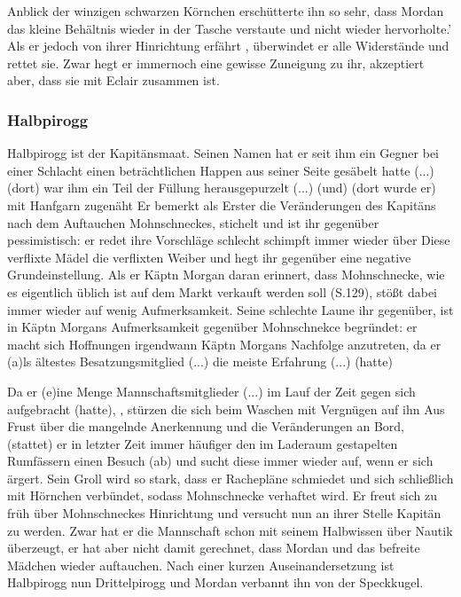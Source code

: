 Anblick der winzigen schwarzen Körnchen erschütterte ihn so sehr, dass Mordan das kleine Behältnis wieder in der Tasche verstaute und nicht wieder hervorholte.'\cite[S.531]{pir} Als er jedoch von ihrer Hinrichtung erfährt , überwindet er alle Widerstände und rettet sie. \cite[S.620]{pir} Zwar hegt er immernoch eine gewisse Zuneigung zu ihr, akzeptiert aber, dass sie mit Eclair zusammen ist. \cite[S.632f]{pir}

\subsubsection{Halbpirogg}
Halbpirogg ist der Kapitänsmaat. Seinen Namen hat er seit ihm ein Gegner bei einer Schlacht 
einen beträchtlichen Happen aus seiner Seite gesäbelt hatte (...)(dort) 
war ihm ein Teil der Füllung herausgepurzelt (...) 
(und) (dort wurde er) mit Hanfgarn zugenäht\cite[S. 33]{pir}
Er bemerkt als Erster die Veränderungen des Kapitäns nach 
dem Auftauchen Mohnschneckes, stichelt und ist ihr gegenüber pessimistisch:
er redet ihre Vorschläge schlecht \cite[S. 266]{pir} schimpft immer wieder über Diese verflixte Mädel\cite[S. 145]{pir}
die verflixten Weiber \cite[302]{pir}und 
hegt ihr gegenüber eine negative Grundeinstellung. \cite[S. 297]{pir}
Als er Käptn Morgan daran erinnert, dass Mohnschnecke, wie es eigentlich üblich ist \cite[S.50]{pir} 
auf dem Markt verkauft werden soll (S.129), stößt dabei immer wieder auf wenig Aufmerksamkeit. \cite[S. 145]{pir}
Seine schlechte Laune ihr gegenüber, ist in Käptn Morgans Aufmerksamkeit gegenüber Mohnschnekce begründet: er macht
sich Hoffnungen irgendwann Käptn Morgans Nachfolge anzutreten, 
da er (a)ls ältestes Besatzungsmitglied (...) die meiste Erfahrung (...) (hatte)\cite[S.371]{pir}
 
Da er (e)ine Menge Mannschaftsmitglieder  (...) im Lauf der Zeit gegen sich aufgebracht (hatte), \cite[S.151]{pir}, 
stürzen die sich beim Waschen mit Vergnügen auf ihn \cite[S.151]{pir}
Aus Frust über die mangelnde Anerkennung und die Veränderungen an Bord, 
(stattet) er in letzter Zeit immer häufiger den im Laderaum gestapelten Rumfässern 
einen Besuch (ab) \cite[S. 181]{pir} und sucht diese immer wieder auf, wenn er sich ärgert.\cite[S. 303]{pir} Sein Groll wird so stark, dass er Rachepläne schmiedet \cite[S.535ff]{pir} und sich schließlich mit Hörnchen verbündet, \cite[S.539ff]{pir} sodass Mohnschnecke verhaftet wird.\cite[S.555]{pir} Er freut sich zu früh über Mohnschneckes Hinrichtung \cite[S.622]{pir} und versucht nun an ihrer Stelle Kapitän zu werden.\cite[S.622]{pir} Zwar hat er die Mannschaft schon mit seinem Halbwissen über Nautik überzeugt, \cite[S.623]{pir} er hat aber nicht damit gerechnet, dass Mordan und das befreite Mädchen wieder auftauchen.\cite[S.626]{pir} Nach einer kurzen Auseinandersetzung \cite[S.627f]{pir} ist Halbpirogg nun Drittelpirogg\cite[S.630]{pir} und Mordan verbannt ihn von der Speckkugel.\cite[S.630]{pir}


